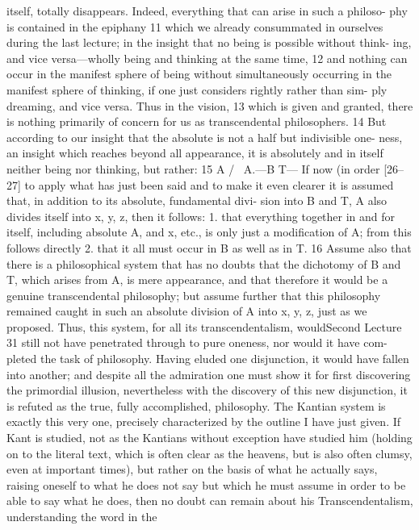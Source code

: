 itself, totally disappears. Indeed, everything that can arise in such a philoso-
phy is contained in the epiphany 11 which we already consummated in ourselves
during the last lecture; in the insight that no being is possible without think-
ing, and vice versa—wholly being and thinking at the same time, 12 and nothing
can occur in the manifest sphere of being without simultaneously occurring in
the manifest sphere of thinking, if one just considers rightly rather than sim-
ply dreaming, and vice versa. Thus in the vision, 13 which is given and granted,
there is nothing primarily of concern for us as transcendental philosophers. 14
But according to our insight that the absolute is not a half but indivisible one-
ness, an insight which reaches beyond all appearance, it is absolutely and in
itself neither being nor thinking, but rather: 15
A
/ \
A.—B T—
If now (in order [26–27] to apply what has just been said and to make
it even clearer it is assumed that, in addition to its absolute, fundamental divi-
sion into B and T, A also divides itself into x, y, z, then it follows:
1. that everything together in and for itself, including absolute A, and x, etc.,
is only just a modification of A; from this follows directly
2. that it all must occur in B as well as in T. 16
Assume also that there is a philosophical system that has no doubts that
the dichotomy of B and T, which arises from A, is mere appearance, and that
therefore it would be a genuine transcendental philosophy; but assume further
that this philosophy remained caught in such an absolute division of A into x,
y, z, just as we proposed. Thus, this system, for all its transcendentalism, wouldSecond Lecture
31
still not have penetrated through to pure oneness, nor would it have com-
pleted the task of philosophy. Having eluded one disjunction, it would have
fallen into another; and despite all the admiration one must show it for first
discovering the primordial illusion, nevertheless with the discovery of this new
disjunction, it is refuted as the true, fully accomplished, philosophy.
The Kantian system is exactly this very one, precisely characterized by
the outline I have just given. If Kant is studied, not as the Kantians without
exception have studied him (holding on to the literal text, which is often clear
as the heavens, but is also often clumsy, even at important times), but rather
on the basis of what he actually says, raising oneself to what he does not say
but which he must assume in order to be able to say what he does, then no
doubt can remain about his Transcendentalism, understanding the word in the
